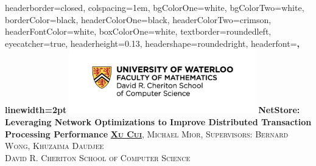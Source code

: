 \documentclass[landscape,archE,fontscale=0.29]{baposter} %
\begin{document}
\begin{poster}
{
headerborder=closed, %
colspacing=1em, %
bgColorOne=white, %
bgColorTwo=white, %
borderColor=black, %
headerColorOne=black, %
headerColorTwo=crimson, %
headerFontColor=white, %
boxColorOne=white, %
textborder=roundedleft, %
eyecatcher=true, %
headerheight=0.13\textheight, %
headershape=roundedright, %
headerfont=\Large\bf\textsc, %
linewidth=2pt %
}
%
{\includegraphics[height=7.5em]{img/Cheriton_Logo.pdf}} %
{\bf\textsc\small{NetStore: Leveraging Network Optimizations to Improve Distributed Transaction Processing Performance}\vspace{0.1em}} %
{\vspace{-2mm}
\textsc{\textbf{\underline{Xu Cui}}, Michael Mior, Supervisors: Bernard Wong,
    Khuzaima Daudjee \\ David R. Cheriton School of Computer Science}} %


\end{poster}
\end{document}
